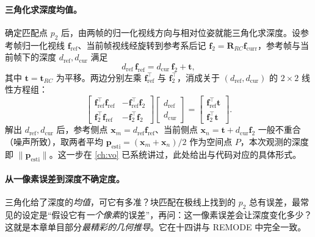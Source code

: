 \paragraph{三角化求深度均值。}
确定匹配点 $p_2$ 后，由两帧的归一化视线方向与相对位姿就能三角化求深度。设参考帧归一化视线 $\mathbf{f}_{\mathrm{ref}}$、当前帧视线经旋转到参考系后记 $\mathbf{f}_2=\mathbf{R}_{RC}\mathbf{f}_{\mathrm{curr}}$，参考帧与当前帧下的深度 $d_{\mathrm{ref}},d_{\mathrm{cur}}$ 满足
\begin{equation}
  d_{\mathrm{ref}}\,\mathbf{f}_{\mathrm{ref}} = d_{\mathrm{cur}}\,\mathbf{f}_2 + \mathbf{t},
  \label{eq:dense-tri-eq}
\end{equation}
其中 $\mathbf{t}=\mathbf{t}_{RC}$ 为平移。两边分别左乘 $\mathbf{f}_{\mathrm{ref}}^\top$ 与 $\mathbf{f}_2^\top$，消成关于 $(d_{\mathrm{ref}},d_{\mathrm{cur}})$ 的 $2\times2$ 线性方程组：
\begin{equation}
  \begin{bmatrix} \mathbf{f}_{\mathrm{ref}}^\top\mathbf{f}_{\mathrm{ref}} & -\mathbf{f}_{\mathrm{ref}}^\top\mathbf{f}_2 \\[1mm] \mathbf{f}_2^\top\mathbf{f}_{\mathrm{ref}} & -\mathbf{f}_2^\top\mathbf{f}_2 \end{bmatrix}
  \begin{bmatrix} d_{\mathrm{ref}}\\ d_{\mathrm{cur}}\end{bmatrix} =
  \begin{bmatrix} \mathbf{f}_{\mathrm{ref}}^\top\mathbf{t} \\ \mathbf{f}_2^\top\mathbf{t} \end{bmatrix}.
  \label{eq:dense-tri-linear}
\end{equation}
解出 $d_{\mathrm{ref}},d_{\mathrm{cur}}$ 后，参考侧点 $\mathbf{x}_m=d_{\mathrm{ref}}\mathbf{f}_{\mathrm{ref}}$、当前侧点 $\mathbf{x}_n=\mathbf{t}+d_{\mathrm{cur}}\mathbf{f}_2$ 一般不重合（噪声所致），取两者平均 $\mathbf{p}_{\mathrm{esti}}=(\mathbf{x}_m+\mathbf{x}_n)/2$ 作为空间点 $P$，本次观测的深度即 $\|\mathbf{p}_{\mathrm{esti}}\|$。这一步在 \cref{ch:vo} 已系统讲过，此处给出与代码对应的具体形式。

\paragraph{从一像素误差到深度不确定度。}
三角化给了深度的\emph{均值}，可它有多准？块匹配在极线上找到的 $p_2$ 总有误差，最常见的设定是“假设它有\emph{一个像素}的误差”，再问：这一像素误差会让深度变化多少？这就是本章单目部分\emph{最精彩的几何推导}。它在十四讲\cite{gaoxiang2019slam14}与 REMODE\cite{pizzoli2014remode} 中完全一致。

